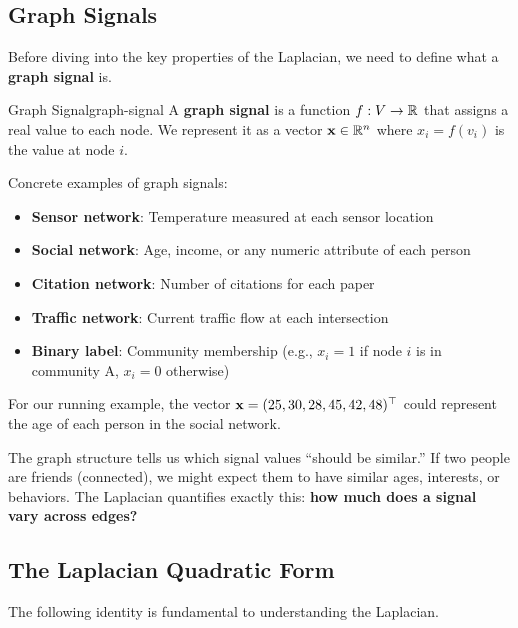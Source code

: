 \begin{notechapter}
\subsection{Graph Signals}

Before diving into the key properties of the Laplacian, we need to define what a \textbf{graph signal} is.

\begin{definition}{Graph Signal}{graph-signal}
A \textbf{graph signal} is a function $f: V \to \mathbb{R}$ that assigns a real value to each node. We represent it as a vector $\mathbf{x} \in \mathbb{R}^n$ where $x_i = f(v_i)$ is the value at node $i$.
\end{definition}

\begin{example}
Concrete examples of graph signals:
\begin{itemize}
    \item \textbf{Sensor network}: Temperature measured at each sensor location
    \item \textbf{Social network}: Age, income, or any numeric attribute of each person
    \item \textbf{Citation network}: Number of citations for each paper
    \item \textbf{Traffic network}: Current traffic flow at each intersection
    \item \textbf{Binary label}: Community membership (e.g., $x_i = 1$ if node $i$ is in community A, $x_i = 0$ otherwise)
\end{itemize}

For our running example, the vector $\mathbf{x} = (25, 30, 28, 45, 42, 48)^\top$ could represent the age of each person in the social network.
\end{example}

\begin{keyidea}
The graph structure tells us which signal values ``should be similar.'' If two people are friends (connected), we might expect them to have similar ages, interests, or behaviors. The Laplacian quantifies exactly this: \textbf{how much does a signal vary across edges?}
\end{keyidea}

\subsection{The Laplacian Quadratic Form}

The following identity is fundamental to understanding the Laplacian.


\end{notechapter}
